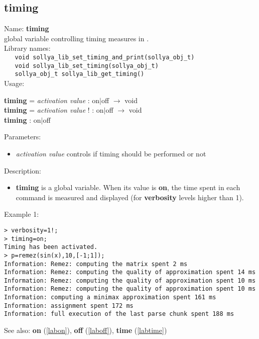 \subsection{timing}
\label{labtiming}
\noindent Name: \textbf{timing}\\
\phantom{aaa}global variable controlling timing measures in \sollya.\\[0.2cm]
\noindent Library names:\\
\verb|   void sollya_lib_set_timing_and_print(sollya_obj_t)|\\
\verb|   void sollya_lib_set_timing(sollya_obj_t)|\\
\verb|   sollya_obj_t sollya_lib_get_timing()|\\[0.2cm]
\noindent Usage: 
\begin{center}
\textbf{timing} = \emph{activation value} : \textsf{on$|$off} $\rightarrow$ \textsf{void}\\
\textbf{timing} = \emph{activation value} ! : \textsf{on$|$off} $\rightarrow$ \textsf{void}\\
\textbf{timing} : \textsf{on$|$off}\\
\end{center}
Parameters: 
\begin{itemize}
\item \emph{activation value} controls if timing should be performed or not
\end{itemize}
\noindent Description: \begin{itemize}

\item \textbf{timing} is a global variable. When its value is \textbf{on}, the time spent in each 
   command is measured and displayed (for \textbf{verbosity} levels higher than 1).
\end{itemize}
\noindent Example 1: 
\begin{center}\begin{minipage}{15cm}\begin{Verbatim}[frame=single]
> verbosity=1!;
> timing=on;
Timing has been activated.
> p=remez(sin(x),10,[-1;1]);
Information: Remez: computing the matrix spent 2 ms
Information: Remez: computing the quality of approximation spent 14 ms
Information: Remez: computing the quality of approximation spent 10 ms
Information: Remez: computing the quality of approximation spent 10 ms
Information: computing a minimax approximation spent 161 ms
Information: assignment spent 172 ms
Information: full execution of the last parse chunk spent 188 ms
\end{Verbatim}
\end{minipage}\end{center}
See also: \textbf{on} (\ref{labon}), \textbf{off} (\ref{laboff}), \textbf{time} (\ref{labtime})
